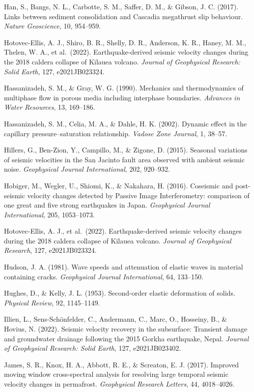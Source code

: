 \documentclass[draft]{agujournal2019}
\begin{document}
Han, S., Bangs, N. L., Carbotte, S. M., Saffer, D. M., \& Gibson, J. C.
(2017). Links between sediment consolidation and Cascadia megathrust
slip behaviour. \emph{Nature Geoscience}, 10, 954--959.

Hotovec-Ellis, A. J., Shiro, B. R., Shelly, D. R., Anderson, K. R.,
Haney, M. M., Thelen, W. A., et al.~(2022). Earthquake-derived seismic
velocity changes during the 2018 caldera collapse of Kīlauea volcano.
\emph{Journal of Geophysical Research: Solid Earth}, 127, e2021JB023324.

Hassanizadeh, S. M., \& Gray, W. G. (1990). Mechanics and thermodynamics
of multiphase flow in porous media including interphase boundaries.
\emph{Advances in Water Resources}, 13, 169--186.

Hassanizadeh, S. M., Celia, M. A., \& Dahle, H. K. (2002). Dynamic
effect in the capillary pressure--saturation relationship. \emph{Vadose
Zone Journal}, 1, 38--57.

Hillers, G., Ben-Zion, Y., Campillo, M., \& Zigone, D. (2015). Seasonal
variations of seismic velocities in the San Jacinto fault area observed
with ambient seismic noise. \emph{Geophysical Journal International},
202, 920--932.

Hobiger, M., Wegler, U., Shiomi, K., \& Nakahara, H. (2016). Coseismic
and post-seismic velocity changes detected by Passive Image
Interferometry: comparison of one great and five strong earthquakes in
Japan. \emph{Geophysical Journal International}, 205, 1053--1073.

Hotovec-Ellis, A. J., et al.~(2022). Earthquake-derived seismic velocity
changes during the 2018 caldera collapse of Kīlauea volcano.
\emph{Journal of Geophysical Research}, 127, e2021JB023324.

Hudson, J. A. (1981). Wave speeds and attenuation of elastic waves in
material containing cracks. \emph{Geophysical Journal International},
64, 133--150.

Hughes, D., \& Kelly, J. L. (1953). Second-order elastic deformation of
solids. \emph{Physical Review}, 92, 1145--1149.

Illien, L., Sens-Schönfelder, C., Andermann, C., Marc, O., Hosseiny, B.,
\& Hovius, N. (2022). Seismic velocity recovery in the subsurface:
Transient damage and groundwater drainage following the 2015 Gorkha
earthquake, Nepal. \emph{Journal of Geophysical Research: Solid Earth},
127, e2021JB023402.

James, S. R., Knox, H. A., Abbott, R. E., \& Screaton, E. J. (2017).
Improved moving window cross-spectral analysis for resolving large
temporal seismic velocity changes in permafrost. \emph{Geophysical
Research Letters}, 44, 4018--4026.
\end{document}
